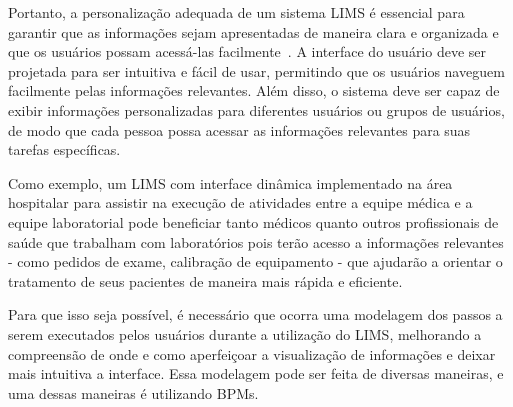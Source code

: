 Portanto, a personalização adequada de um sistema LIMS é essencial para garantir que as informações sejam apresentadas de maneira clara e organizada e que os usuários possam acessá-las facilmente~\cite{Tomlinson2022AOperations}. A interface do usuário deve ser projetada para ser intuitiva e fácil de usar, permitindo que os usuários naveguem facilmente pelas informações relevantes. Além disso, o sistema deve ser capaz de exibir informações personalizadas para diferentes usuários ou grupos de usuários, de modo que cada pessoa possa acessar as informações relevantes para suas tarefas específicas.


Como exemplo, um LIMS com interface dinâmica implementado na área hospitalar para assistir na execução de atividades entre a equipe médica e a equipe laboratorial pode beneficiar tanto médicos quanto outros profissionais de saúde que trabalham com laboratórios pois terão acesso a informações relevantes - como pedidos de exame, calibração de equipamento - que ajudarão a orientar o tratamento de seus pacientes de maneira mais rápida e eficiente.

Para que isso seja possível, é necessário que ocorra uma modelagem dos passos a serem executados pelos usuários durante a utilização do LIMS, melhorando a compreensão de onde e como aperfeiçoar a visualização de informações e deixar mais intuitiva a interface. Essa modelagem pode ser feita de diversas maneiras, e uma dessas maneiras é utilizando BPMs.